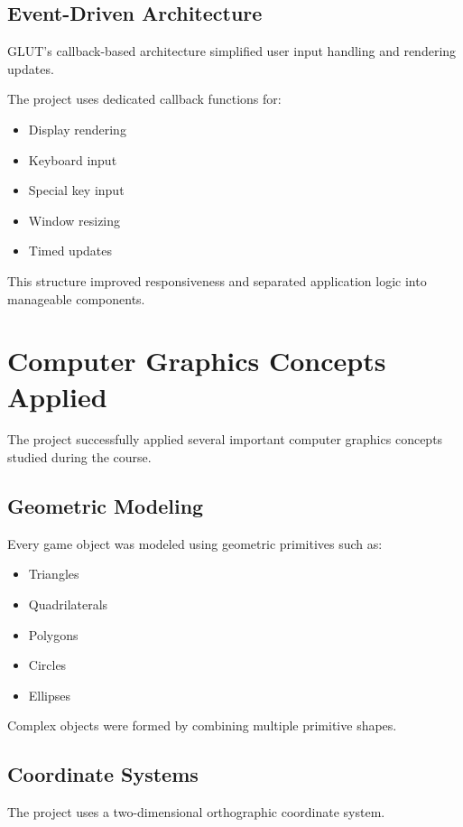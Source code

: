 \documentclass[12pt,a4paper]{report}
\begin{document}
\subsection*{Event-Driven Architecture}

GLUT's callback-based architecture simplified user input handling and rendering updates.

The project uses dedicated callback functions for:

\begin{itemize}
\item Display rendering
\item Keyboard input
\item Special key input
\item Window resizing
\item Timed updates
\end{itemize}

This structure improved responsiveness and separated application logic into manageable components.

\section{Computer Graphics Concepts Applied}

The project successfully applied several important computer graphics concepts studied during the course.

\subsection*{Geometric Modeling}

Every game object was modeled using geometric primitives such as:

\begin{itemize}
\item Triangles
\item Quadrilaterals
\item Polygons
\item Circles
\item Ellipses
\end{itemize}

Complex objects were formed by combining multiple primitive shapes.

\subsection*{Coordinate Systems}

The project uses a two-dimensional orthographic coordinate system.
\end{document}
